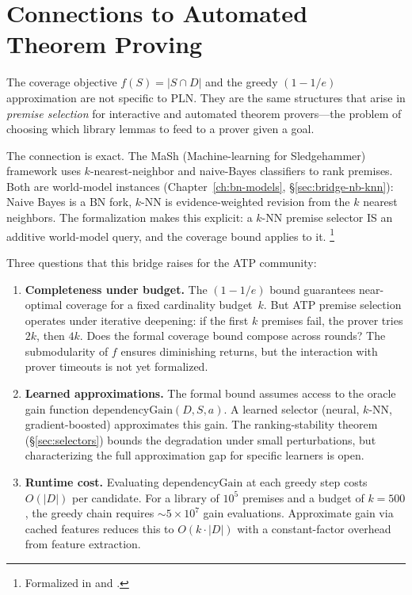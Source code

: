 \documentclass[11pt,openany]{report}
\begin{document}
\section{Connections to Automated Theorem Proving}
\label{sec:atp}

The coverage objective $f(S) = |S \cap D|$ and the greedy
$(1 - 1/e)$ approximation are not specific to PLN.  They are the
same structures that arise in \emph{premise selection} for
interactive and automated theorem provers---the problem of choosing
which library lemmas to feed to a prover given a goal.

The connection is exact.  The MaSh (Machine-learning for Sledgehammer)
framework uses $k$-nearest-neighbor and naive-Bayes classifiers to
rank premises.  Both are world-model instances
(Chapter~\ref{ch:bn-models}, \S\ref{sec:bridge-nb-knn}): Naive Bayes
is a BN fork, $k$-NN is evidence-weighted revision from the $k$
nearest neighbors.  The formalization makes this explicit: a
$k$-NN premise selector IS an additive world-model query, and the
coverage bound applies to it.%
\footnote{Formalized in
 and
.}

Three questions that this bridge raises for the ATP community:

\begin{enumerate}
\item \textbf{Completeness under budget.}  The $(1 - 1/e)$ bound
  guarantees near-optimal coverage for a fixed cardinality budget~$k$.
  But ATP premise selection operates under iterative deepening:
  if the first $k$ premises fail, the prover tries $2k$, then $4k$.
  Does the formal coverage bound compose across rounds?  The
  submodularity of $f$ ensures diminishing returns, but the
  interaction with prover timeouts is not yet formalized.

\item \textbf{Learned approximations.}  The formal bound assumes
  access to the oracle gain function $\mathrm{dependencyGain}(D, S, a)$.
  A learned selector (neural, $k$-NN, gradient-boosted) approximates
  this gain.  The ranking-stability theorem
  (\S\ref{sec:selectors}) bounds the degradation under
  small perturbations, but characterizing the full approximation gap
  for specific learners is open.

\item \textbf{Runtime cost.}  Evaluating $\mathrm{dependencyGain}$
  at each greedy step costs $O(|D|)$ per candidate.  For a library
  of $10^5$ premises and a budget of $k = 500$, the greedy chain
  requires $\sim 5 \times 10^7$ gain evaluations.  Approximate
  gain via cached features reduces this to $O(k \cdot |D|)$ with a
  constant-factor overhead from feature extraction.
\end{enumerate}
\end{document}
